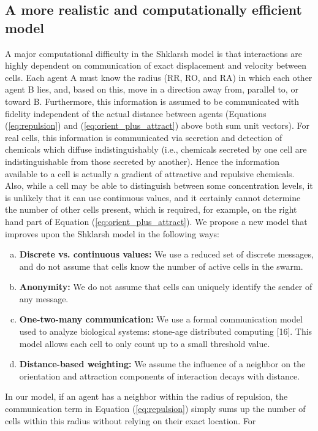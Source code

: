 \documentclass{article}
\begin{document}
\subsection*{A more realistic and computationally efficient model}
A major computational difficulty in the Shklarsh model is that interactions are
highly dependent on communication of exact displacement and velocity between
cells. Each agent A must know the radius (RR, RO, and RA) in which each other
agent B lies, and, based on this, move in a direction away from, parallel to,
or toward B. Furthermore, this information is assumed to be communicated with
fidelity independent of the actual distance between agents (Equations
(\ref{eq:repulsion}) and (\ref{eq:orient_plus_attract}) above both sum unit
vectors). For real cells, this information is communicated via secretion and
detection of chemicals which diffuse indistinguishably (i.e., chemicals
secreted by one cell are indistinguishable from those secreted by another).
Hence the information available to a cell is actually a gradient of attractive
and repulsive chemicals. Also, while a cell may be able to distinguish between
some concentration levels, it is unlikely that it can use continuous values,
and it certainly cannot determine the number of other cells present, which is
required, for example, on the right hand part of Equation
(\ref{eq:orient_plus_attract}). We propose a new model that improves upon the
Shklarsh model in the following ways:
\begin{enumerate}[a)]
\item {\bf Discrete vs. continuous values:} We use a reduced set of discrete
messages, and do not assume that cells know the number of active cells in the
swarm.
\item {\bf Anonymity:} We do not assume that cells can uniquely identify the
sender of any message.
\item {\bf One-two-many communication:} We use a formal communication model
used to analyze biological systems: stone-age distributed computing [16]. This
model allows each cell to only count up to a small threshold value.
\item {\bf Distance-based weighting:} We assume the influence of a neighbor on
the orientation and attraction components of interaction decays with distance.
\end{enumerate}
In our model, if an agent has a neighbor within the radius of repulsion, the
communication term in Equation (\ref{eq:repulsion}) simply sums up the number
of cells within this radius without relying on their exact location. For
\end{document}
